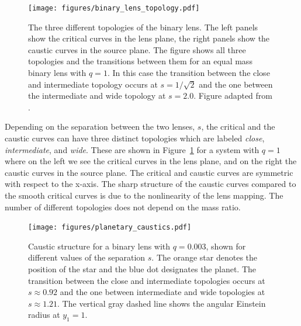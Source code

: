 \documentclass[12pt]{report}
\begin{document}
\begin{figure}[t]
    \centering
    \texttt{[image: figures/binary\_lens\_topology.pdf]}
    \caption{The three different topologies of the binary lens. The left panels show the
        critical curves in the lens plane, the right panels show the caustic curves in the
        source plane. The figure shows all three topologies and the transitions between
        them for an equal mass binary lens with $q=1$. In this case the transition between
        the close and intermediate topology occurs at $s=1/\sqrt{2}$ and the one between
        the intermediate and wide topology at $s=2.0$. Figure adapted from
        \citet{dominik1999}.
    }
    \label{fig:binary_lens_topology}
\end{figure}

Depending on the separation between the two lenses, $s$, the critical and the
caustic curves can have three distinct topologies which are labeled
\emph{close}, \emph{intermediate}, and \emph{wide}. These are shown in
Figure~\ref{fig:binary_lens_topology} for a system with $q=1$ where on the left
we see the critical curves in the lens plane, and on the right the caustic
curves in the source plane. The critical and caustic curves are symmetric with
respect to the x-axis. The sharp structure of the caustic curves compared to
the smooth critical curves is due to the nonlinearity of the lens mapping. The
number of different topologies does not depend on the mass ratio.

\begin{figure}[t]
    \centering
    \texttt{[image: figures/planetary\_caustics.pdf]}
    \caption{Caustic structure for a binary lens with $q=0.003$, shown for different
        values of the separation $s$. The orange star denotes the position of the star and
        the blue dot designates the planet.
        The transition between the close and intermediate
        topologies occurs at $s\approx 0.92$ and the one between intermediate and wide
        topologies at $s\approx 1.21$. The vertical gray dashed line shows the angular
        Einstein radius at $y_1=1$. }
    \label{fig:planetary_caustics}
\end{figure}
\end{document}
